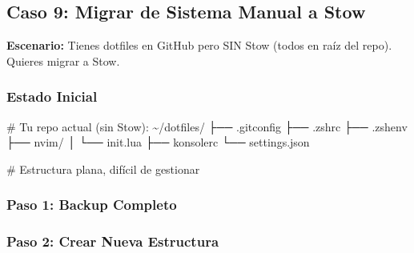 \documentclass[
  doc,
  floatsintext,
  longtable,
  a4paper,
  nolmodern,
  notxfonts,
  notimes,
  12pt,
  colorlinks=true,linkcolor=blue,citecolor=blue,urlcolor=blue]{apa7}
\newenvironment{Shaded}{\begin{snugshade}}{\end{snugshade}}
\newcommand{\AttributeTok}[1]{\textcolor[rgb]{0.40,0.45,0.13}{#1}}
\newcommand{\CommentTok}[1]{\textcolor[rgb]{0.37,0.37,0.37}{#1}}
\newcommand{\ExtensionTok}[1]{\textcolor[rgb]{0.00,0.23,0.31}{#1}}
\newcommand{\FunctionTok}[1]{\textcolor[rgb]{0.28,0.35,0.67}{#1}}
\newcommand{\NormalTok}[1]{\textcolor[rgb]{0.00,0.23,0.31}{#1}}
\newcommand{\VariableTok}[1]{\textcolor[rgb]{0.07,0.07,0.07}{#1}}
\begin{document}
\subsection{Caso 9: Migrar de Sistema Manual a
Stow}\label{caso-9-migrar-de-sistema-manual-a-stow}

\textbf{Escenario:} Tienes dotfiles en GitHub pero SIN Stow (todos en
raíz del repo). Quieres migrar a Stow.

\subsubsection{Estado Inicial}\label{estado-inicial}

\begin{Shaded}
\begin{Highlighting}[]
\CommentTok{\# Tu repo actual (sin Stow):}
\ExtensionTok{\textasciitilde{}/dotfiles/}
\ExtensionTok{├──}\NormalTok{ .gitconfig}
\ExtensionTok{├──}\NormalTok{ .zshrc}
\ExtensionTok{├──}\NormalTok{ .zshenv}
\ExtensionTok{├──}\NormalTok{ nvim/}
\ExtensionTok{│}\NormalTok{   └── init.lua}
\ExtensionTok{├──}\NormalTok{ konsolerc}
\ExtensionTok{└──}\NormalTok{ settings.json}

\CommentTok{\# Estructura plana, difícil de gestionar}
\end{Highlighting}
\end{Shaded}

\subsubsection{Paso 1: Backup Completo}\label{paso-1-backup-completo}

\begin{Shaded}
\end{Shaded}

\subsubsection{Paso 2: Crear Nueva
Estructura}\label{paso-2-crear-nueva-estructura}
\end{document}
